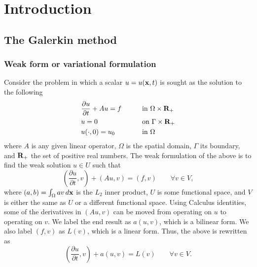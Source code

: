 \documentclass[oneside,a4paper,11pt]{report}
\begin{document}
\chapter{Introduction}
\section{The Galerkin method}
\subsection{Weak form or variational formulation}
Consider the problem in which a scalar $u = u(\mathbf{x},t)$ is sought as the solution to the following
\begin{equation}
    \label{eq:fe_general_pde}
    \begin{aligned}
        &\frac{\partial u}{\partial t} + Au = f \qquad &&\text{in } \Omega \times \mathbf{R}_+ \\
        &u = 0 && \text{on } \Gamma \times \mathbf{R}_+ \\
        &u(\cdot,0) = u_0 && \text{in } \Omega 
    \end{aligned}
\end{equation}
where $A$ is any given linear operator, $\Omega$ is the spatial domain, $\Gamma$ its boundary, and $\mathbf{R}_+$ the set of positive real numbers. The weak formulation of the above is to find the weak solution $u\in U$ such that 
\begin{equation}
    \left ( \frac{\partial u}{\partial t} , v \right ) + (Au,v) = (f,v) \qquad \forall v \in V,
\end{equation}
where $(a,b)= \int_\Omega av \, d\mathbf{x}$ is the $L_2$ inner product, $U$ is some functional space, and $V$ is either the same as $U$ or a different functional space. Using Calculus identities, some of the derivatives in $(Au,v)$ can be moved from operating on $u$ to operating on $v$. We label the end result as $a(u,v)$, which is a bilinear form. We also label $(f,v)$ as $L(v)$, which is a linear form. Thus, the above is rewritten as 
\begin{equation}
\label{eq:weak_form}
    \left ( \frac{\partial u}{\partial t} , v \right ) + a(u,v) = L(v) \qquad \forall v \in V .
\end{equation}
\end{document}
